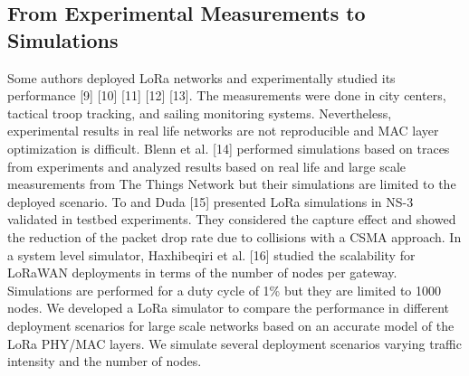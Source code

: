 \subsection{From Experimental Measurements to Simulations}
Some authors deployed LoRa networks and experimentally studied its performance [9] [10] [11] [12] [13].
The measurements were done in city centers,
	tactical troop tracking,
	and sailing monitoring systems.
Nevertheless,
	experimental results in real life networks are not reproducible and MAC layer optimization is difficult.
Blenn et al.
[14] performed simulations based on traces from experiments and analyzed results based on real life and large scale measurements from The Things Network but their simulations are limited to the deployed scenario.
To and Duda [15] presented LoRa simulations in NS-3 validated in testbed experiments.
They considered the capture effect and showed the reduction of the packet drop rate due to collisions with a CSMA approach.
In a system level simulator,
	Haxhibeqiri et al.
[16] studied the scalability for LoRaWAN deployments in terms of the number of nodes per gateway.
Simulations are performed for a duty cycle of 1\% but they are limited to 1000 nodes.
We developed a LoRa simulator to compare the performance in different deployment scenarios for large scale networks based on an accurate model of the LoRa PHY/MAC layers.
We simulate several deployment scenarios varying traffic intensity and the number of nodes.

